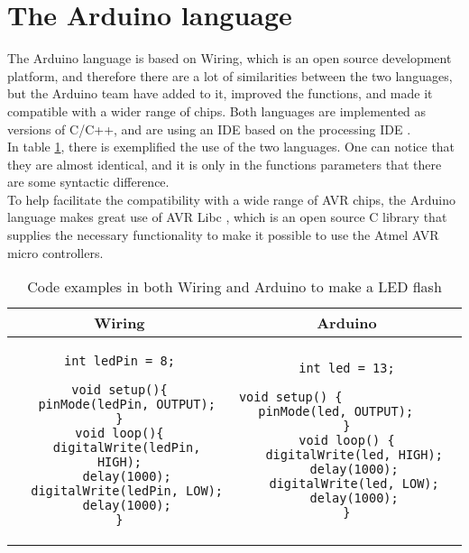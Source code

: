 \section{The Arduino language}
The Arduino language is based on Wiring, which is an open source development platform, and therefore there are a lot of similarities between the two languages, but the Arduino team have added to it, improved the functions, and made it compatible with a wider range of chips. Both languages are implemented as versions of C/C++, and are using an IDE based on the processing IDE \cite{Wiring:thesis}\cite{Arduino:IDE}.\\

In table \ref{tabel:comparison}, there is exemplified the use of the two languages. One can notice that they are almost identical, and it is only in the functions parameters that there are some syntactic difference.\\ 
To help facilitate the compatibility with a wide range of AVR chips, the Arduino language makes great use of AVR Libc \cite{AVR:lib}, which is an open source C library that supplies the necessary functionality to make it possible to use the Atmel AVR micro controllers.\\

\begin{table}[H]
\centering
\begin{tabular}{cc}
Wiring 
& 
Arduino \\ 
\hline 
\begin{lstlisting}
int ledPin = 8;

void setup(){
  pinMode(ledPin, OUTPUT);
}
void loop(){
  digitalWrite(ledPin, HIGH);
  delay(1000);
  digitalWrite(ledPin, LOW);
  delay(1000);
}
\end{lstlisting}  
& 
\begin{lstlisting}
int led = 13;

void setup() {                
  pinMode(led, OUTPUT);     
}
void loop() {
  digitalWrite(led, HIGH);
  delay(1000);
  digitalWrite(led, LOW);
  delay(1000);
}
\end{lstlisting} 
\end{tabular} 
\caption{Code examples in both Wiring and Arduino to make a LED flash}
\label{tabel:comparison}
\end{table}

